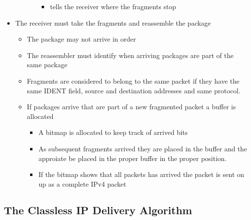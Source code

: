 \documentclass[11pt]{article}
\providecommand{\tightlist}{%
      \setlength{\itemsep}{0pt}\setlength{\parskip}{0pt}}
\begin{document}
\begin{itemize}
\begin{itemize}
\begin{itemize}
      \begin{itemize}
      \tightlist
      \item
        tells the receiver where the fragments stop
      \end{itemize}
    \end{itemize}
  \end{itemize}
\item
  The receiver must take the fragments and reassemble the package

  \begin{itemize}
  \tightlist
  \item
    The package may not arrive in order
  \item
    The reassembler must identify when arriving packages are part of the
    same package
  \item
    Fragments are considered to belong to the same packet if they have
    the same IDENT field, source and destination addresses and same
    protocol.
  \item
    If packages arrive that are part of a new fragmented packet a buffer
    is allocated

    \begin{itemize}
    \tightlist
    \item
      A bitmap is allocated to keep track of arrived bits
    \item
      As subsequent fragments arrived they are placed in the buffer and
      the approiate be placed in the proper buffer in the proper
      position.
    \item
      If the bitmap shows that all packets has arrived the packet is
      sent on up as a complete IPv4 packet
    \end{itemize}
  \end{itemize}
\end{itemize}

    \subsection{The Classless IP Delivery
Algorithm}\label{the-classless-ip-delivery-algorithm}
\end{document}
